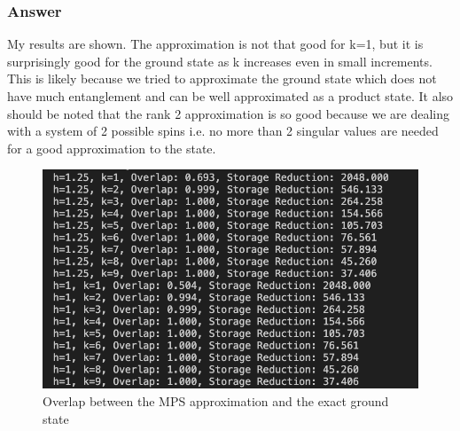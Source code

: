 \documentclass[12pt]{article}
\begin{document}
\subsubsection{Answer}
My results are shown. The approximation is not that good for k=1, but it is surprisingly good for the ground state as k increases even in small increments. This is likely because we tried to approximate the ground state which does not have much entanglement and can be well approximated as a product state. It also should be noted that the rank 2 approximation is so good because we are dealing with a system of 2 possible spins i.e. no more than 2 singular values are needed for a good approximation to the state.
\begin{figure}[h]
\centering
\includegraphics[width=\textwidth]{overlap.png}
\caption{Overlap between the MPS approximation and the exact ground state}
\end{figure}
\end{document}
